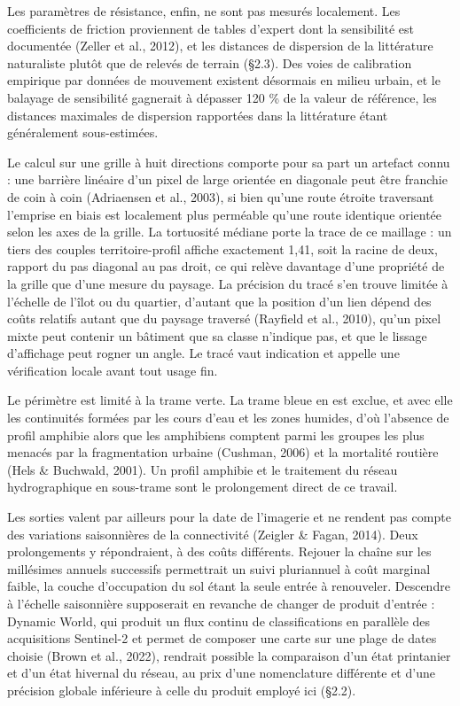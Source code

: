 \documentclass[a4paper,12pt]{report}
\begin{document}
Les paramètres de résistance, enfin, ne sont pas mesurés localement. Les coefficients de friction proviennent de tables d'expert dont la sensibilité est documentée (Zeller et al., 2012), et les distances de dispersion de la littérature naturaliste plutôt que de relevés de terrain (§2.3). Des voies de calibration empirique par données de mouvement existent désormais en milieu urbain, et le balayage de sensibilité gagnerait à dépasser 120 \% de la valeur de référence, les distances maximales de dispersion rapportées dans la littérature étant généralement sous-estimées.
 
Le calcul sur une grille à huit directions comporte pour sa part un artefact connu : une barrière linéaire d'un pixel de large orientée en diagonale peut être franchie de coin à coin (Adriaensen et al., 2003), si bien qu'une route étroite traversant l'emprise en biais est localement plus perméable qu'une route identique orientée selon les axes de la grille. La tortuosité médiane porte la trace de ce maillage : un tiers des couples territoire-profil affiche exactement 1,41, soit la racine de deux, rapport du pas diagonal au pas droit, ce qui relève davantage d'une propriété de la grille que d'une mesure du paysage. La précision du tracé s'en trouve limitée à l'échelle de l'îlot ou du quartier, d'autant que la position d'un lien dépend des coûts relatifs autant que du paysage traversé (Rayfield et al., 2010), qu'un pixel mixte peut contenir un bâtiment que sa classe n'indique pas, et que le lissage d'affichage peut rogner un angle. Le tracé vaut indication et appelle une vérification locale avant tout usage fin.
 
Le périmètre est limité à la trame verte. La trame bleue en est exclue, et avec elle les continuités formées par les cours d'eau et les zones humides, d'où l'absence de profil amphibie alors que les amphibiens comptent parmi les groupes les plus menacés par la fragmentation urbaine (Cushman, 2006) et la mortalité routière (Hels \& Buchwald, 2001). Un profil amphibie et le traitement du réseau hydrographique en sous-trame sont le prolongement direct de ce travail.
 
Les sorties valent par ailleurs pour la date de l'imagerie et ne rendent pas compte des variations saisonnières de la connectivité (Zeigler \& Fagan, 2014). Deux prolongements y répondraient, à des coûts différents. Rejouer la chaîne sur les millésimes annuels successifs permettrait un suivi pluriannuel à coût marginal faible, la couche d'occupation du sol étant la seule entrée à renouveler. Descendre à l'échelle saisonnière supposerait en revanche de changer de produit d'entrée : Dynamic World, qui produit un flux continu de classifications en parallèle des acquisitions Sentinel-2 et permet de composer une carte sur une plage de dates choisie (Brown et al., 2022), rendrait possible la comparaison d'un état printanier et d'un état hivernal du réseau, au prix d'une nomenclature différente et d'une précision globale inférieure à celle du produit employé ici (§2.2).
 
\end{document}
